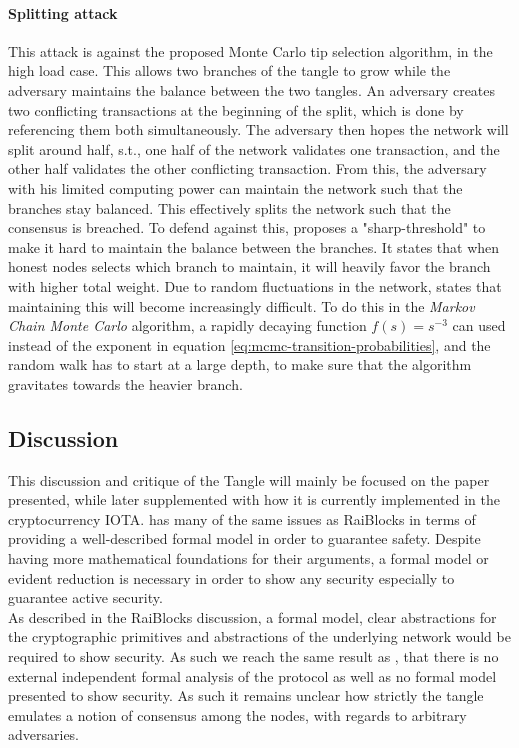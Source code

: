\paragraph{Splitting attack} This attack is against the proposed Monte Carlo tip selection algorithm, in the high load case. This allows two branches of the tangle to grow while the adversary maintains the balance between the two tangles. An adversary creates two conflicting transactions at the beginning of the split, which is done by referencing them both simultaneously. The adversary then hopes the network will split around half, s.t., one half of the network validates one transaction, and the other half validates the other conflicting transaction. From this, the adversary with his limited computing power can maintain the network such that the branches stay balanced. This effectively splits the network such that the consensus is breached. To defend against this, \cite{tangle} proposes a "sharp-threshold" to make it hard to maintain the balance between the branches. It states that when honest nodes selects which branch to maintain, it will heavily favor the branch with higher total weight. Due to random fluctuations in the network, \cite{tangle} states that maintaining this will become increasingly difficult. To do this in the \emph{Markov Chain Monte Carlo} algorithm, a rapidly decaying function $f(s) = s^{-3}$ can used instead of the exponent in equation \ref{eq:mcmc-transition-probabilities}, and the random walk has to start at a large depth, to make sure that the algorithm gravitates towards the heavier branch.


\subsection*{Discussion}

This discussion and critique of the Tangle will mainly be focused on the paper presented, while later supplemented with how it is currently implemented in the cryptocurrency IOTA. \cite{tangle} has many of the same issues as RaiBlocks in terms of providing a well-described formal model in order to guarantee safety. Despite having more mathematical foundations for their arguments, a formal model or evident reduction is necessary in order to show any security especially to guarantee active security. \\

As described in the RaiBlocks discussion, a formal model, clear abstractions for the cryptographic primitives and abstractions of the underlying network would be required to show security. As such we reach the same result as \cite{consensus-wild}, that there is no external independent formal analysis of the protocol as well as no formal model presented to show security. As such it remains unclear how strictly the tangle emulates a notion of consensus among the nodes, with regards to arbitrary adversaries. \\

